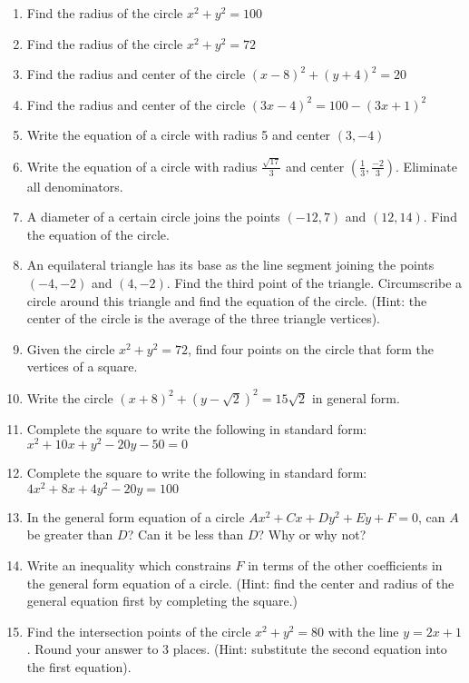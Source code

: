 \documentclass[
]{article}
\providecommand{\tightlist}{%
  \setlength{\itemsep}{0pt}\setlength{\parskip}{0pt}}
\begin{document}
\begin{enumerate}
\def\labelenumi{\arabic{enumi}.}
\tightlist
\item
  Find the radius of the circle \(x^2 + y^2 = 100\)
\item
  Find the radius of the circle \(x^2 + y^2 = 72\)
\item
  Find the radius and center of the circle \((x-8)^2 + (y+4)^2 = 20\)
\item
  Find the radius and center of the circle
  \((3x-4)^2 = 100 - (3x + 1)^2\)
\item
  Write the equation of a circle with radius 5 and center \((3,-4)\)
\item
  Write the equation of a circle with radius \(\frac{\sqrt{17}}{3}\) and
  center \((\frac13,\frac{-2}{3})\). Eliminate all denominators.
\item
  A diameter of a certain circle joins the points \((-12,7)\) and
  \((12,14)\). Find the equation of the circle.
\item
  An equilateral triangle has its base as the line segment joining the
  points \((-4,-2)\) and \((4,-2)\). Find the third point of the
  triangle. Circumscribe a circle around this triangle and find the
  equation of the circle. (Hint: the center of the circle is the average
  of the three triangle vertices).
\item
  Given the circle \(x^2 + y^2 = 72\), find four points on the circle
  that form the vertices of a square.
\item
  Write the circle \((x+8)^2 + (y - \sqrt2)^2 = 15\sqrt 2\) in general
  form.
\item
  Complete the square to write the following in standard form:
  \(x^2 + 10x + y^2 - 20y - 50 = 0\)
\item
  Complete the square to write the following in standard form:
  \(4x^2 + 8x + 4y^2 - 20y = 100\)
\item
  In the general form equation of a circle \(Ax^2+Cx+Dy^2+Ey+F=0\), can
  \(A\) be greater than \(D\)? Can it be less than \(D\)? Why or why
  not?
\item
  Write an inequality which constrains \(F\) in terms of the other
  coefficients in the general form equation of a circle. (Hint: find the
  center and radius of the general equation first by completing the
  square.)
\item
  Find the intersection points of the circle \(x^2 + y^2 = 80\) with the
  line \(y=2x+1\). Round your answer to 3 places. (Hint: substitute the
  second equation into the first equation).

\end{enumerate}
\end{document}
